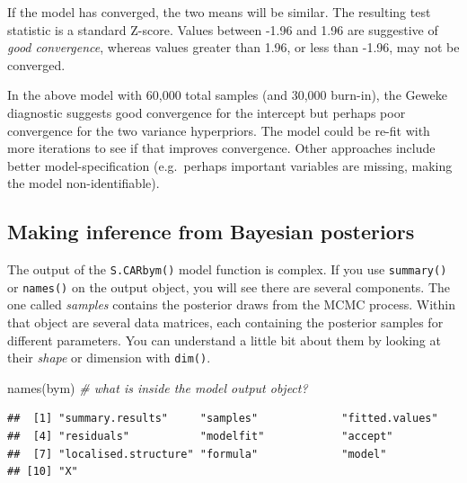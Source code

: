\documentclass[
]{book}
\newenvironment{Shaded}{\begin{snugshade}}{\end{snugshade}}
\newcommand{\CommentTok}[1]{\textcolor[rgb]{0.56,0.35,0.01}{\textit{#1}}}
\newcommand{\FunctionTok}[1]{\textcolor[rgb]{0.00,0.00,0.00}{#1}}
\newcommand{\NormalTok}[1]{#1}
\newcommand{\SpecialCharTok}[1]{\textcolor[rgb]{0.00,0.00,0.00}{#1}}
\begin{document}
If the model has converged, the two means will be similar. The resulting test statistic is a standard Z-score. Values between -1.96 and 1.96 are suggestive of \emph{good convergence}, whereas values greater than 1.96, or less than -1.96, may not be converged.

In the above model with 60,000 total samples (and 30,000 burn-in), the Geweke diagnostic suggests good convergence for the intercept but perhaps poor convergence for the two variance hyperpriors. The model could be re-fit with more iterations to see if that improves convergence. Other approaches include better model-specification (e.g.~perhaps important variables are missing, making the model non-identifiable).

\hypertarget{making-inference-from-bayesian-posteriors}{%
\subsection{Making inference from Bayesian posteriors}\label{making-inference-from-bayesian-posteriors}}

The output of the \texttt{S.CARbym()} model function is complex. If you use \texttt{summary()} or \texttt{names()} on the output object, you will see there are several components. The one called \emph{samples} contains the posterior draws from the MCMC process. Within that object are several data matrices, each containing the posterior samples for different parameters. You can understand a little bit about them by looking at their \emph{shape} or dimension with \texttt{dim()}.

\begin{Shaded}
\begin{Highlighting}[]
\FunctionTok{names}\NormalTok{(bym)          }\CommentTok{\# what is inside the model output object?}
\end{Highlighting}
\end{Shaded}

\begin{verbatim}
##  [1] "summary.results"     "samples"             "fitted.values"      
##  [4] "residuals"           "modelfit"            "accept"             
##  [7] "localised.structure" "formula"             "model"              
## [10] "X"
\end{verbatim}

\begin{Shaded}
\end{Shaded}
\end{document}
